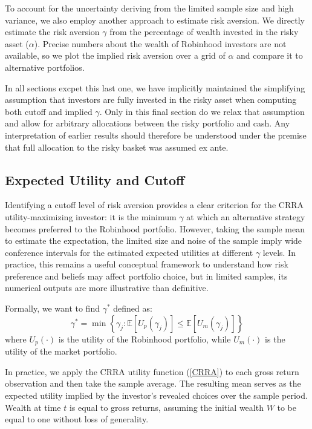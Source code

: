To account for the uncertainty deriving from the limited sample size and high variance, we also employ another approach to estimate risk aversion.  
We directly estimate the risk aversion $\gamma$ from the percentage of wealth invested in the risky asset ($\alpha$). Precise numbers about the wealth of Robinhood investors are not available, so we plot the implied risk aversion over a grid of $\alpha$ and compare it to alternative portfolios.  

In all sections excpet this last one, we have implicitly maintained the simplifying assumption that investors are fully invested in the risky asset when computing both cutoff and implied $\gamma$. 
Only in this final section do we relax that assumption and allow for arbitrary allocations between the risky portfolio and cash. 
Any interpretation of earlier results should therefore be understood under the premise that full allocation to the risky basket was assumed ex ante.  

\subsection{Expected Utility and Cutoff}
\label{sec:cutoff}
Identifying a cutoff level of risk aversion provides a clear criterion for the CRRA utility-maximizing investor: 
it is the minimum $\gamma$ at which an alternative strategy becomes preferred to the Robinhood portfolio.
However, taking the sample mean to estimate the expectation, the limited size and noise of the sample imply wide conference intervals for the estimated expected utilities at different $\gamma$ levels.
In practice, this remains a useful conceptual framework to understand how risk preference and beliefs may affect portfolio choice, but in limited samples, its numerical outputs are more illustrative than definitive.

Formally, we want to find $\gamma^*$ defined as:
\begin{equation}
    \gamma^* = \min\left\{ \gamma_j : \mathbb{E}[U_p(\gamma_j)] \leq \mathbb{E}[U_m(\gamma_j)] \right\}
\label{gamma_cutoff}
\end{equation}
where $U_p(\cdot)$ is the utility of the Robinhood portfolio, while $U_m(\cdot)$ is the utility of the market portfolio.

In practice, we apply the CRRA utility function (\ref{CRRA}) to each gross return observation and then take the sample average.
The resulting mean serves as the expected utility implied by the investor's revealed choices over the sample period.
Wealth at time $t$ is equal to gross returns, assuming the initial wealth $W$ to be equal to one without loss of generality.


